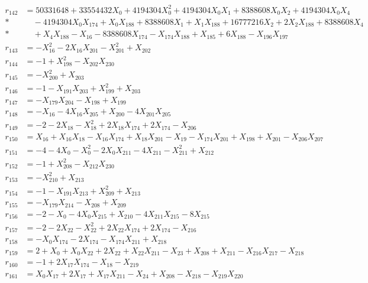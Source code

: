 \begin{align*}
r_{142} &= 50331648 + 33554432X_{0} + 4194304X_{0}^{2} + 4194304X_{0}X_{1} + 8388608X_{0}X_{2} + 4194304X_{0}X_{4} \\*
&\quad  - 4194304X_{0}X_{174} + X_{0}X_{188} + 8388608X_{1} + X_{1}X_{188} + 16777216X_{2} + 2X_{2}X_{188} + 8388608X_{4} \\*
&\quad  + X_{4}X_{188} - X_{16} - 8388608X_{174} - X_{174}X_{188} + X_{185} + 6X_{188} - X_{196}X_{197} \\[3pt]
r_{143} &= -X_{16}^{2} - 2X_{16}X_{201} - X_{201}^{2} + X_{202} \\[3pt]
r_{144} &= -1 + X_{198}^{2} - X_{202}X_{230} \\[3pt]
r_{145} &= -X_{200}^{2} + X_{203} \\[3pt]
r_{146} &= -1 - X_{191}X_{203} + X_{199}^{2} + X_{203} \\[3pt]
r_{147} &= -X_{179}X_{204} - X_{198} + X_{199} \\[3pt]
r_{148} &= -X_{16} - 4X_{16}X_{205} + X_{200} - 4X_{201}X_{205} \\[3pt]
r_{149} &= -2 - 2X_{18} - X_{18}^{2} + 2X_{18}X_{174} + 2X_{174} - X_{206} \\[3pt]
r_{150} &= X_{16} + X_{16}X_{18} - X_{16}X_{174} + X_{18}X_{201} - X_{19} - X_{174}X_{201} + X_{198} + X_{201} - X_{206}X_{207} \\[3pt]
r_{151} &= -4 - 4X_{0} - X_{0}^{2} - 2X_{0}X_{211} - 4X_{211} - X_{211}^{2} + X_{212} \\[3pt]
r_{152} &= -1 + X_{208}^{2} - X_{212}X_{230} \\[3pt]
r_{153} &= -X_{210}^{2} + X_{213} \\[3pt]
r_{154} &= -1 - X_{191}X_{213} + X_{209}^{2} + X_{213} \\[3pt]
r_{155} &= -X_{179}X_{214} - X_{208} + X_{209} \\[3pt]
r_{156} &= -2 - X_{0} - 4X_{0}X_{215} + X_{210} - 4X_{211}X_{215} - 8X_{215} \\[3pt]
r_{157} &= -2 - 2X_{22} - X_{22}^{2} + 2X_{22}X_{174} + 2X_{174} - X_{216} \\[3pt]
r_{158} &= -X_{0}X_{174} - 2X_{174} - X_{174}X_{211} + X_{218} \\[3pt]
r_{159} &= 2 + X_{0} + X_{0}X_{22} + 2X_{22} + X_{22}X_{211} - X_{23} + X_{208} + X_{211} - X_{216}X_{217} - X_{218} \\[3pt]
r_{160} &= -1 + 2X_{17}X_{174} - X_{18} - X_{219} \\[3pt]
r_{161} &= X_{0}X_{17} + 2X_{17} + X_{17}X_{211} - X_{24} + X_{208} - X_{218} - X_{219}X_{220} \\[3pt]

\end{align*}
